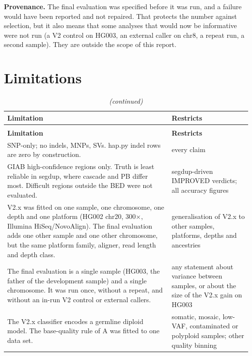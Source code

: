 \documentclass[11pt,a4paper]{article}
\makeatletter
\newcommand{\needspace}[1]{\par\ifdim\pagegoal=\maxdimen\else\dimen@=\pagegoal\advance\dimen@-\pagetotal\ifdim\dimen@<#1\relax\newpage\fi\fi}
\makeatother
\begin{document}
\textbf{Provenance.} The final evaluation was specified before it was run, and a failure would have been reported and not repaired. That protects the number against selection, but it also means that some analyses that would now be informative were not run (a V2 control on HG003, an external caller on chr8, a repeat run, a second sample). They are outside the scope of this report.

\FloatBarrier
\needspace{10\baselineskip}
\section{\texorpdfstring{Limitations}{Limitations}}
{\footnotesize
\setlength{\tabcolsep}{3.2pt}
\begin{xltabular}{\linewidth}{>{\hsize\raggedright\arraybackslash}X>{\hsize\raggedright\arraybackslash}X}
\caption{Limitations and what they restrict.}\\
\toprule
\textbf{Limitation} & \textbf{Restricts} \\
\midrule
\endfirsthead
\caption[]{\textit{(continued)}}\\
\toprule
\textbf{Limitation} & \textbf{Restricts} \\
\midrule
\endhead
SNP-only; no indels, MNPs, SVs. hap.py indel rows are zero by construction. & every claim \\
GIAB high-confidence regions only. Truth is least reliable in segdup, where cascade and PB differ most. Difficult regions outside the BED were not evaluated. & segdup-driven IMPROVED verdicts; all accuracy figures \\
V2.x was fitted on one sample, one chromosome, one depth and one platform (HG002 chr20, 300$\times$, Illumina HiSeq/NovoAlign). The final evaluation adds one other sample and one other chromosome, but the same platform family, aligner, read length and depth class. & generalisation of V2.x to other samples, platforms, depths and ancestries \\
The final evaluation is a single sample (HG003, the father of the development sample) and a single chromosome. It was run once, without a repeat, and without an in-run V2 control or external callers. & any statement about variance between samples, or about the size of the V2.x gain on HG003 \\
The V2.x classifier encodes a germline diploid model. The base-quality rule of A was fitted to one data set. & somatic, mosaic, low-VAF, contaminated or polyploid samples; other quality binning \\

\end{xltabular}}
\end{document}
